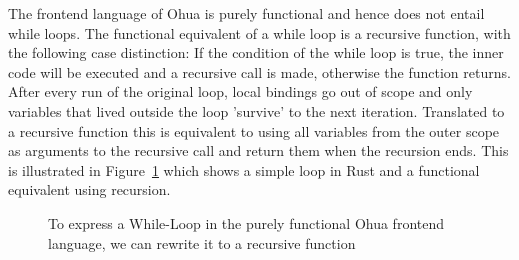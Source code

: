 The frontend language of Ohua is purely functional and hence does not entail while loops. The functional equivalent of a while loop is a recursive function, with the following case distinction: If the condition of the while loop is true, the inner code will be executed and a recursive call is made, otherwise the function returns. After every run of the original loop, local bindings go out of scope and only variables that lived outside the loop 'survive' to the next iteration. Translated to a recursive function this is equivalent to using all variables from the outer scope as arguments to the recursive call and return them when the recursion ends. This is illustrated in Figure~\ref{fig:WhileTransform} which shows a simple  loop in Rust and a functional equivalent using recursion. 

\begin{figure}[H]
\centering
\tabskip=0pt
\caption{To express a While-Loop in the purely functional Ohua frontend language, we can rewrite it to a recursive function}
\label{fig:WhileTransform}
\end{figure}

